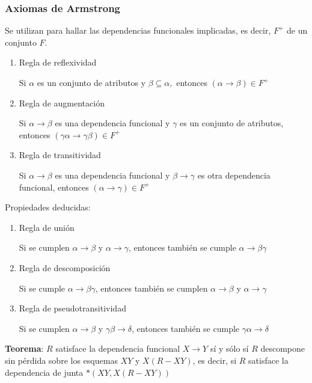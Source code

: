 \documentclass[a4paper, twoside]{article}
\begin{document}
\subsubsection{Axiomas de Armstrong}

Se utilizan para hallar las dependencias funcionales implicadas, es
decir, $F^{+}$ de un conjunto $F$.
\begin{enumerate}
\item Regla de reflexividad


Si $\alpha$ es un conjunto de atributos y $\beta\subseteq\alpha,$
entonces $(\alpha\to\beta)\in F^{+}$

\item Regla de augmentación


Si $\alpha\to\beta$ es una dependencia funcional y $\gamma$ es un
conjunto de atributos, entonces $(\gamma\alpha\to\gamma\beta)\in F^{+}$

\item Regla de transitividad


Si $\alpha\to\beta$ es una dependencia funcional y $\beta\to\gamma$
es otra dependencia funcional, entonces $(\alpha\to\gamma)\in F^{+}$

\end{enumerate}
Propiedades deducidas:
\begin{enumerate}
\item Regla de unión


Si se cumplen $\alpha\to\beta$ y $\alpha\to\gamma$, entonces también
se cumple $\alpha\to\beta\gamma$

\item Regla de descomposición


Si se cumple $\alpha\to\beta\gamma$, entonces también se cumplen
$\alpha\to\beta$ y $\alpha\to\gamma$

\item Regla de pseudotransitividad


Si se cumplen $\alpha\to\beta$ y $\gamma\beta\to\delta$, entonces
también se cumple $\gamma\alpha\to\delta$

\end{enumerate}
\textbf{Teorema}: $R$ satisface la dependencia funcional $X\to Y$
sí y sólo sí $R$ descompone sin pérdida sobre los esquemas $XY$
y $X(R-XY)$, es decir, si $R$ satisface la dependencia de junta
$*\left(XY,X(R-XY)\right)$
\end{document}
